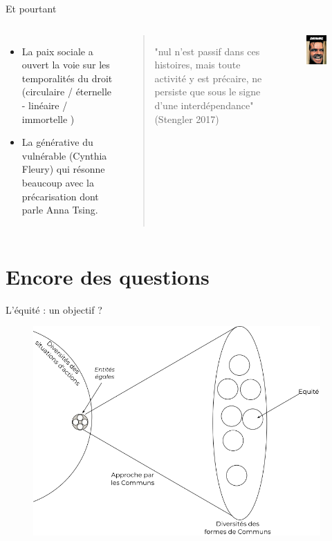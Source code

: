 \documentclass[newPxFont]{beamer}
\begin{document}
\begin{frame}[c]{Et pourtant}
  \vspace{-1cm}
  \begin{columns}[onlytextwidth,T]
    \column{\dimexpr\linewidth-30mm-5mm}
    \begin{itemize}
        \item La paix sociale a ouvert la voie sur les temporalités du droit (circulaire / éternelle - linéaire / immortelle )
        \item La générative du vulnérable (Cynthia Fleury) qui résonne beaucoup avec la précarisation dont parle Anna Tsing.
    \end{itemize}
    \vspace{1cm}
    \begin{quotation}
      "nul n'est passif dans ces histoires, mais toute activité y est précaire, ne persiste que sous le signe d'une interdépendance" (Stengler 2017)
    \end{quotation}
    \column{30mm}
    \begin{figure}
      \includegraphics[width=4cm]{img/shining.jpg}
    \end{figure}
  \end{columns}
\end{frame}

\section{Encore des questions}

\begin{frame}[c]{L'équité : un objectif ?}
  \vspace{-1cm}
  \begin{figure}
    \includegraphics[height=8cm]{img/commun_egalite_equite.png}
  \end{figure}
\end{frame}
\end{document}
